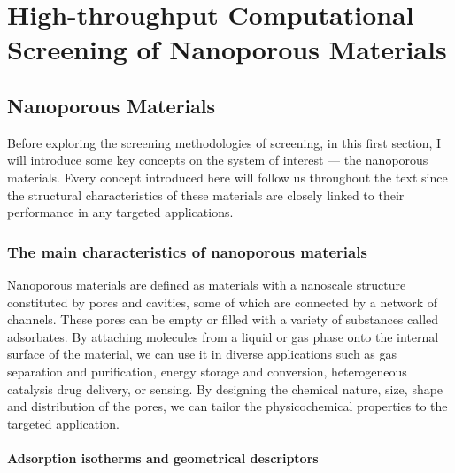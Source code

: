 \documentclass[main.tex]{subfiles}
\begin{document}
\chapter{High-throughput Computational Screening of Nanoporous Materials}
\vspace*{-1\baselineskip}

\section{Nanoporous Materials}

Before exploring the screening methodologies of screening, in this first section, I will introduce some key concepts on the system of interest --- the nanoporous materials. Every concept introduced here will follow us throughout the text since the structural characteristics of these materials are closely linked to their performance in any targeted applications.

\subsection{The main characteristics of nanoporous materials}

Nanoporous materials are defined as materials with a nanoscale structure constituted by pores and cavities, some of which are connected by a network of channels. These pores can be empty or filled with a variety of substances called adsorbates. By attaching molecules from a liquid or gas phase onto the internal surface of the material, we can use it in diverse applications such as gas separation and purification,\autocite{Li_2009,Lagorsse_2007} energy storage and conversion,\autocite{Morris_2008,Qiu_2020} heterogeneous catalysis\autocite{Bell_2003,Singh_2019,Pascanu_2019} drug delivery,\autocite{Della_Rocca_2011,Bernini_2014} or sensing.\autocite{Breslin_1976} By designing the chemical nature, size, shape and distribution of the pores, we can tailor the physicochemical properties to the targeted application.\autocite{Yan_2020}

\subsubsection{Adsorption isotherms and geometrical descriptors}
\end{document}
